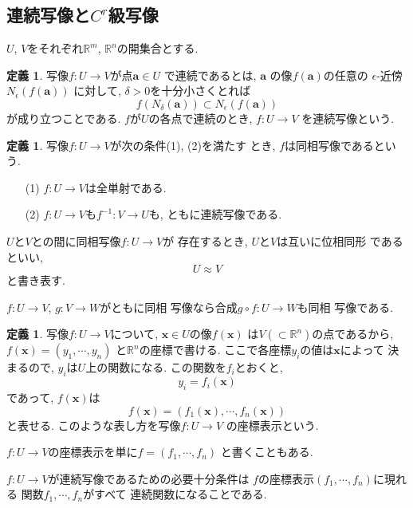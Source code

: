 \documentclass[a4j,12pt]{jarticle}
\theoremstyle{definition}
\newtheorem{definition}[theorem]{定義}
\begin{document}
\subsection{連続写像と$C^r$級写像}
$U$, $V$をそれぞれ$\mathbb{R}^m$, 
$\mathbb{R}^n$の開集合とする. 
\begin{definition}\label{def:continuous map}
    写像$f:U\to V$が点$\boldsymbol{a}\in U$
    で連続であるとは, $\boldsymbol{a}$
    の像$f(\boldsymbol{a})$の任意の
    $\epsilon$-近傍$N_\epsilon(f(\boldsymbol{a}))$
    に対して, $\delta>0$を十分小さくとれば
    $$f(N_\delta(\boldsymbol{a}))\subset
    N_\epsilon(f(\boldsymbol{a}))$$
    が成り立つことである. 
    $f$が$U$の各点で連続のとき, $f:U\to V$
    を連続写像という. 
\end{definition}
\begin{definition}\label{def:homeomorphism}
    写像$f:U\to V$が次の条件(1), (2)を満たす
    とき, $f$は同相写像であるという. 
    \begin{itemize}
        \item[(1)]
        $f:U\to V$は全単射である. 
        \item[(2)]
        $f:U\to V$も$f^{-1}:V\to U$も, 
        ともに連続写像である. 
    \end{itemize}

    $U$と$V$との間に同相写像$f:U\to V$が
    存在するとき, $U$と$V$は互いに位相同形
    であるといい, 
    $$U \approx V$$
    と書き表す. 
\end{definition}
$f:U\to V$, $g:V\to W$がともに同相
写像なら合成$g\circ f:U\to W$も同相
写像である. 
\begin{definition}\label{def:coordinate display}
    写像$f:U\to V$について, 
    $\boldsymbol{x}\in U$の像$f(\boldsymbol{x})$
    は$V(\subset \mathbb{R}^n)$の点であるから, 
    $f(\boldsymbol{x})=(y_1,\cdots ,y_n)$
    と$\mathbb{R}^n$の座標で書ける. 
    ここで各座標$y_i$の値は$\boldsymbol{x}$によって
    決まるので, $y_i$は$U$上の関数になる. 
    この関数を$f_i$とおくと, 
    $$y_i=f_i(\boldsymbol{x})$$
    であって, $f(\boldsymbol{x})$は
    $$f(\boldsymbol{x})=(f_1(\boldsymbol{x}),
    \cdots ,f_n(\boldsymbol{x}))$$
    と表せる. このような表し方を写像$f:U\to V$
    の座標表示という. 

    $f:U\to V$の座標表示を単に$f=(f_1,\cdots ,f_n)$
    と書くこともある. 
\end{definition}
$f:U\to V$が連続写像であるための必要十分条件は
$f$の座標表示$(f_1,\cdots ,f_n)$に現れる
関数$f_1,\cdots ,f_n$がすべて
連続関数になることである. 
\end{document}
